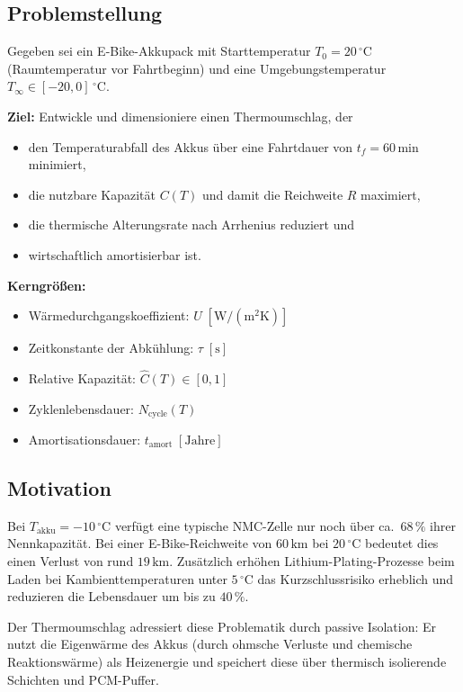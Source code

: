 ﻿\documentclass[a4paper,12pt]{article}
\theoremstyle{definition}
\begin{document}
\subsection{Problemstellung}

Gegeben sei ein E-Bike-Akkupack mit Starttemperatur $T_0 = 20\,{}^\circ\mathrm{C}$ (Raumtemperatur vor Fahrtbeginn) und eine Umgebungstemperatur $T_\infty \in [-20, 0]\,{}^\circ\mathrm{C}$.

\textbf{Ziel:} Entwickle und dimensioniere einen Thermoumschlag, der
\begin{itemize}
  \item den Temperaturabfall des Akkus \"uber eine Fahrtdauer von $t_f = 60\,\mathrm{min}$ minimiert,
  \item die nutzbare Kapazit\"at $C(T)$ und damit die Reichweite $R$ maximiert,
  \item die thermische Alterungsrate nach Arrhenius reduziert und
  \item wirtschaftlich amortisierbar ist.
\end{itemize}

\textbf{Kerngr\"o\ss{}en:}
\begin{itemize}
  \item W\"armedurchgangskoeffizient: $U\;[\mathrm{W/(m^2 K)}]$
  \item Zeitkonstante der Abk\"uhlung: $\tau\;[\mathrm{s}]$
  \item Relative Kapazit\"at: $\hat{C}(T) \in [0,1]$
  \item Zyklenlebensdauer: $N_\mathrm{cycle}(T)$
  \item Amortisationsdauer: $t_\mathrm{amort}\;[\mathrm{Jahre}]$
\end{itemize}

\subsection{Motivation}

Bei $T_\mathrm{akku} = -10\,{}^\circ\mathrm{C}$ verf\"ugt eine typische NMC-Zelle nur noch \"uber ca.\ $68\,\%$ ihrer Nennkapazit\"at. Bei einer E-Bike-Reichweite von $60\,\mathrm{km}$ bei $20\,{}^\circ\mathrm{C}$ bedeutet dies einen Verlust von rund $19\,\mathrm{km}$. Zus\"atzlich erh\"ohen Lithium-Plating-Prozesse beim Laden bei Kambienttemperaturen unter $5\,{}^\circ\mathrm{C}$ das Kurzschlussrisiko erheblich und reduzieren die Lebensdauer um bis zu $40\,\%$.

Der Thermoumschlag adressiert diese Problematik durch passive Isolation: Er nutzt die Eigenw\"arme des Akkus (durch ohmsche Verluste und chemische Reaktionsw\"arme) als Heizenergie und speichert diese \"uber thermisch isolierende Schichten und PCM-Puffer.
\end{document}
